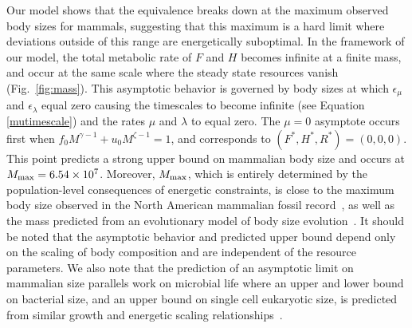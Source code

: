 \documentclass{pnastwo}
\begin{document}
\begin{article}
Our model shows that the equivalence breaks down at the maximum observed body sizes for mammals, suggesting that this maximum is a hard limit where deviations outside of this range are energetically suboptimal. %
In the framework of our model, the total metabolic rate of $F$ and $H$ becomes infinite at a finite mass, and occur at the same scale where the steady state resources vanish (Fig.~\ref{fig:mass}). This asymptotic behavior is governed by body sizes at which $\epsilon_{\mu}$ and $\epsilon_{\lambda}$ equal zero causing the timescales to become infinite (see Equation \ref{mutimescale}) and the rates $\mu$ and $\lambda$ to equal zero.
The $\mu=0$ asymptote occurs first when $f_{0}M^{\gamma-1}+u_{0}M^{\zeta-1}=1$, and corresponds to $(F^*,H^*,R^*)=(0,0,0)$. This point predicts a strong upper bound on mammalian body size and occurs at $M_{\rm max}=6.54\times10^7$.
Moreover, $M_{\rm max}$, which is entirely determined by the population-level consequences of energetic constraints, is close to the maximum body size observed in the North American mammalian fossil record~\cite{Alroy:1998p1594}, as well as the mass predicted from an evolutionary model of body size evolution~\cite{Clauset:2009fh}.
It should be noted that the asymptotic behavior and predicted upper bound depend only on the scaling of body composition and are independent of the resource parameters.
We also note that the prediction of an asymptotic limit on mammalian size parallels work on microbial life where an upper and lower bound on bacterial size, and an upper bound on single cell eukaryotic size, is predicted from similar growth and energetic scaling relationships~\cite{Kempes:2012hy,Kempes:2016}. %




\end{article}
\end{document}
